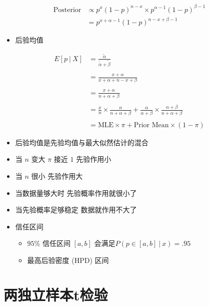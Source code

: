 \documentclass[]{book}
\providecommand{\tightlist}{%
  \setlength{\itemsep}{0pt}\setlength{\parskip}{0pt}}
\begin{document}
\begin{align}
\mbox{Posterior} &\propto  p^x(1 - p)^{n-x} \times p^{\alpha -1} (1 - p)^{\beta - 1} \\
                 &  =      p^{x + \alpha - 1} (1 - p)^{n - x + \beta - 1}
\end{align}

\begin{itemize}
\tightlist
\item
  后验均值
\end{itemize}

\begin{align}
E[p ~|~ X] & =   \frac{\tilde \alpha}{\tilde \alpha + \tilde \beta}\\ \\
& =  \frac{x + \alpha}{x + \alpha + n - x + \beta}\\ \\
& =  \frac{x + \alpha}{n + \alpha + \beta} \\ \\
& =  \frac{x}{n} \times \frac{n}{n + \alpha + \beta} + \frac{\alpha}{\alpha + \beta} \times \frac{\alpha + \beta}{n + \alpha + \beta} \\ \\
& =  \mbox{MLE} \times \pi + \mbox{Prior Mean} \times (1 - \pi)
\end{align}

\begin{itemize}
\tightlist
\item
  后验均值是先验均值与最大似然估计的混合
\item
  当 \(n\) 变大 \(\pi\) 接近 \(1\) 先验作用小
\item
  当 \(n\) 很小 先验作用大
\item
  当数据量够大时 先验概率作用就很小了
\item
  当先验概率足够稳定 数据就作用不大了
\item
  信任区间

  \begin{itemize}
  \tightlist
  \item
    \(95\%\) 信任区间 \([a, b]\) 会满足\(P(p \in [a, b] ~|~ x) = .95\)
  \item
    最高后验密度 (HPD) 区间
  \end{itemize}
\end{itemize}

\hypertarget{ux4e24ux72ecux7acbux6837ux672ctux68c0ux9a8c}{%
\section{两独立样本t检验}\label{ux4e24ux72ecux7acbux6837ux672ctux68c0ux9a8c}}
\end{document}
